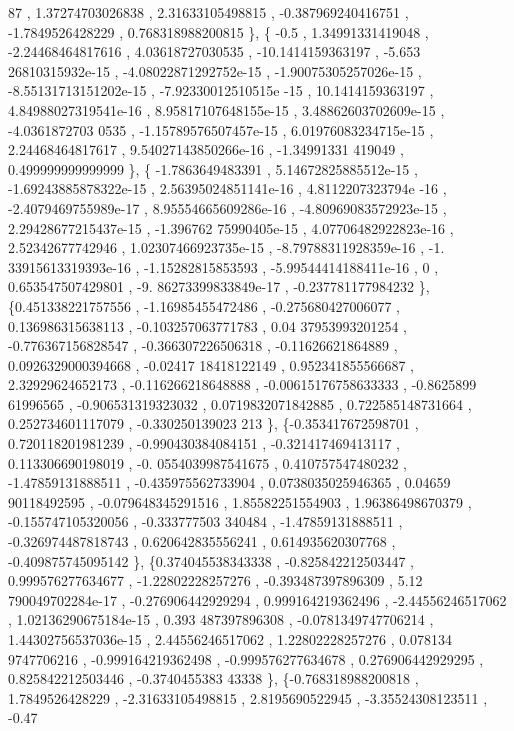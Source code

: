 \begin{DoxyCode}
      87 ,  1.37274703026838 ,  2.31633105498815 , -0.387969240416751 ,  -1.7849526428229 , 0.768318988200815 \},
\{             -0.5 ,  1.34991331419048 , -2.24468464817616 ,  4.03618727030535 , -10.1414159363197 , -5.653
      26810315932e-15 , -4.08022871292752e-15 , -1.90075305257026e-15 , -8.55131713151202e-15 , -7.92330012510515e
      -15 ,  10.1414159363197 , 4.84988027319541e-16 , 8.95817107648155e-15 , 3.48862603702609e-15 , -4.0361872703
      0535 , -1.15789576507457e-15 , 6.01976083234715e-15 ,  2.24468464817617 , 9.54027143850266e-16 , -1.34991331
      419049 , 0.499999999999999 \},
\{ -1.7863649483391 , 5.14672825885512e-15 , -1.69243885878322e-15 , 2.56395024851141e-16 , 4.8112207323794e
      -16 , -2.4079469755989e-17 , 8.95554665609286e-16 , -4.80969083572923e-15 , 2.29428677215437e-15 , -1.396762
      75990405e-15 , 4.07706482922823e-16 ,  2.52342677742946 , 1.02307466923735e-15 , -8.79788311928359e-16 , -1.
      33915613319393e-16 , -1.15282815853593 , -5.99544414188411e-16 ,                 0 , 0.653547507429801 , -9.
      86273399833849e-17 , -0.237781177984232 \},
\{0.451338221757556 , -1.16985455472486 , -0.275680427006077 , 0.136986315638113 , -0.103257063771783 , 0.04
      37953993201254 , -0.776367156828547 , -0.366307226506318 , -0.11626621864889 , 0.0926329000394668 , -0.02417
      18418122149 , 0.952341855566687 ,  2.32929624652173 , -0.116266218648888 , -0.00615176758633333 , -0.8625899
      61996565 , -0.906531319323032 , 0.0719832071842885 , 0.722585148731664 , 0.252734601117079 , -0.330250139023
      213 \},
\{-0.353417672598701 , 0.720118201981239 , -0.990430384084151 , -0.321417469413117 , 0.113306690198019 , -0.
      0554039987541675 , 0.410757547480232 , -1.47859131888511 , -0.435975562733904 , 0.0738035025946365 , 0.04659
      90118492595 , -0.079648345291516 ,  1.85582251554903 ,  1.96386498670379 , -0.155747105320056 , -0.333777503
      340484 , -1.47859131888511 , -0.326974487818743 , 0.620642835556241 , 0.614935620307768 , -0.409875745095142
       \},
\{0.374045538343338 , -0.825842212503447 , 0.999576277634677 , -1.22802228257276 , -0.393487397896309 , 5.12
      790049702284e-17 , -0.276906442929294 , 0.999164219362496 , -2.44556246517062 , 1.02136290675184e-15 , 0.393
      487397896308 , -0.0781349747706214 , 1.44302756537036e-15 ,  2.44556246517062 ,  1.22802228257276 , 0.078134
      9747706216 , -0.999164219362498 , -0.999576277634678 , 0.276906442929295 , 0.825842212503446 , -0.3740455383
      43338 \},
\{-0.768318988200818 ,   1.7849526428229 , -2.31633105498815 ,   2.8195690522945 , -3.35524308123511 , -0.47

\end{DoxyCode}

